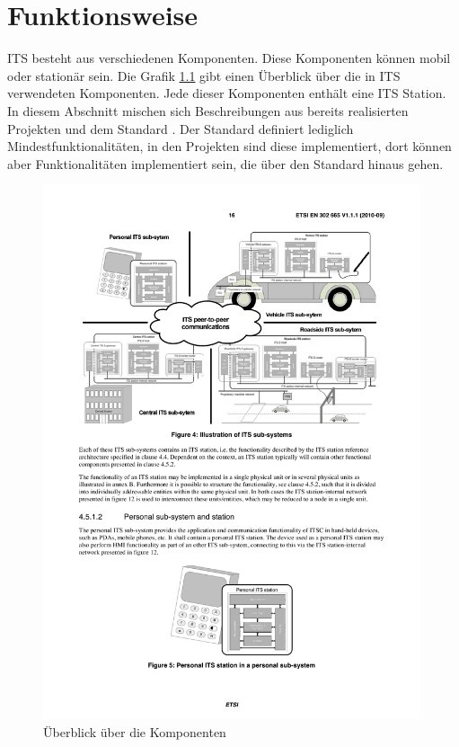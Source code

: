 \chapter{Funktionsweise \label{chap_funktionsweise}}
\ac{ITS} besteht aus verschiedenen Komponenten. Diese Komponenten können mobil oder stationär sein. Die Grafik \ref{fig:funktionsweise_komponentenueberblick} gibt einen Überblick über die in \ac{ITS} verwendeten Komponenten. Jede dieser Komponenten enthält eine \ac{ITS} Station. In diesem Abschnitt mischen sich Beschreibungen aus bereits realisierten Projekten und dem Standard \cite{etsi2010302}. Der Standard definiert lediglich Mindestfunktionalitäten, in den Projekten sind diese implementiert, dort können aber Funktionalitäten implementiert sein, die über den Standard hinaus gehen.

\begin{figure}
\includegraphics[width=0.99\textwidth]{content/images/01_funktionsweise/ueberblick-ITS-subsystems.pdf}
\caption{Überblick über die Komponenten \cite{etsi2010302}}
\label{fig:funktionsweise_komponentenueberblick}
\end{figure}

